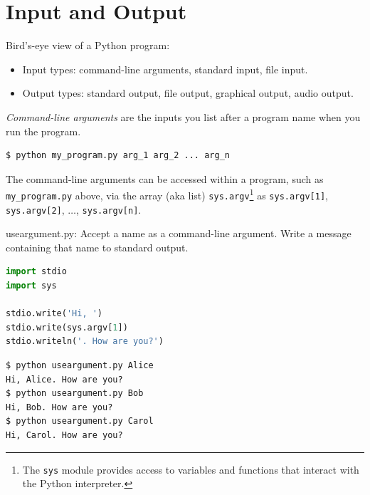 \documentclass[8pt,a4paper,compress,handout]{beamer}
\begin{document}
\section{Input and Output}
\begin{frame}[fragile]
Bird's-eye view of a Python program:
\begin{center}
\end{center}
\begin{itemize}
\item Input types: command-line arguments, standard input, file input.
\item Output types: standard output, file output, graphical output, audio output.
\end{itemize}
\end{frame}

\begin{frame}[fragile]
\emph{Command-line arguments} are the inputs you list after a program name when you run the program.

\begin{lstlisting}[language={}]
$ python my_program.py arg_1 arg_2 ... arg_n
\end{lstlisting}

\bigskip

The command-line arguments can be accessed within a program, such as \lstinline{my_program.py} above, via the array (aka list) \lstinline{sys.argv}\footnote{The \lstinline{sys} module provides access to variables and functions that interact with the Python interpreter.}  as \lstinline{sys.argv[1]}, \lstinline{sys.argv[2]}, $\dots$, \lstinline{sys.argv[n]}.
\end{frame}

\begin{frame}[fragile]
\begin{framed}
\tiny useargument.py: Accept a name as a command-line argument. Write a message containing that name to standard output.
\end{framed}

\begin{lstlisting}[language=Python]
import stdio
import sys

stdio.write('Hi, ')
stdio.write(sys.argv[1])
stdio.writeln('. How are you?')
\end{lstlisting}

\begin{lstlisting}[language={}]
$ python useargument.py Alice
Hi, Alice. How are you?
$ python useargument.py Bob
Hi, Bob. How are you?
$ python useargument.py Carol
Hi, Carol. How are you?
\end{lstlisting}
\end{frame}
\end{document}
